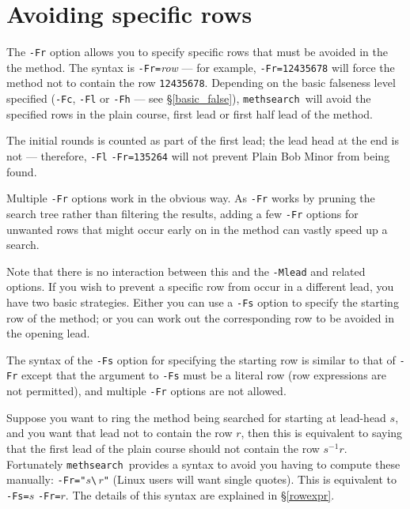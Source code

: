 \documentclass[a4paper,11pt,oneside]{book}
\makeatletter
\newcommand{\oidx}[2]{\index{#1@{\hspace*{-\optwidth}\texttt{-}#2}|ulink}}
\newcommand{\oi}[1]{\index{#1@{\hspace*{-\optwidth}\texttt{-}\texttt{#1}}}}
\def\methsearch{\texttt{meth\-search}}
\newcommand{\sref}[1]{\hyperref[#1]{\S\ref{#1}}}
\makeatother
\begin{document}

\section{Avoiding specific rows}\label{avoidrow}

The \verb+-Fr+\oidx{Fr}{\texttt{Fr}} option allows you to specify
specific rows that must be avoided in the the method.%
The syntax is \verb+-Fr=+\textit{row} --- for example, \verb+-Fr=12435678+
will force the method not to contain the row \verb+12435678+.
Depending on the basic falseness level specified (\verb+-Fc+, \verb+-Fl+ 
or \verb+-Fh+\oi{Fc}\oi{Fl}\oi{Fh} --- see \sref{basic_false}), 
\methsearch\ will avoid the specified rows in the plain course, 
first lead or first half lead of the method.

The initial rounds is counted as part of the first lead;
the lead head at the end is not --- therefore, \verb+-Fl+ 
\verb+-Fr=135264+ will not prevent Plain Bob Minor from being found.

Multiple \verb+-Fr+ options work in the obvious way.  As \verb+-Fr+ works by 
pruning the search tree rather than filtering the results, adding a few 
\verb+-Fr+ options for unwanted rows that might occur early on in the 
method can vastly speed up a search.

Note that there is no interaction between this and the \verb+-Mlead+ and 
related options.  If you wish to prevent a specific row from occur in a 
different lead, you have two basic strategies.   Either you can use a 
\verb+-Fs+ option to specify the starting row of the method;
or you can work out the corresponding row to be avoided in the opening lead.  

The syntax of the \verb+-Fs+\oidx{Fs}{\texttt{Fs}} option for specifying
the starting row is similar to that of \verb+-Fr+ except that the
argument to \verb+-Fs+ must be a literal row (row expressions are not 
permitted), and multiple \verb+-Fr+ options are not allowed.

Suppose you want to ring the method being searched for starting at lead-head 
$s$, and you want that lead not to contain the row $r$, then this is 
equivalent to saying that the first lead of the plain course should not 
contain the row $s^{-1} r$.
Fortunately \methsearch\ provides a syntax to avoid you having to
compute these manually: \verb+-Fr="+$s$\verb+\+$\,r$\verb+"+ (Linux users
will want single quotes).  This is equivalent to \verb+-Fs=+$s$ \verb+-Fr=+$r$.
The details of this syntax are explained in \sref{rowexpr}.
\end{document}
